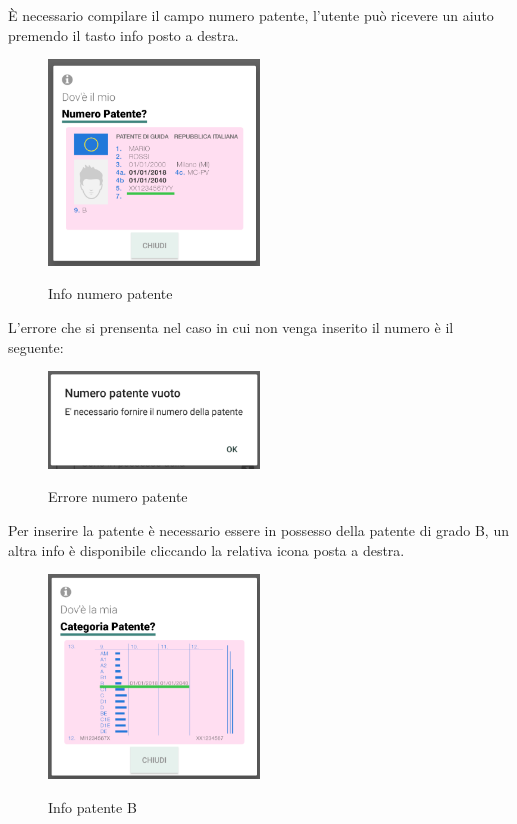 \begin{itemize}
È necessario compilare il campo numero patente, l'utente può ricevere un aiuto premendo il tasto info posto a destra.
 \begin{figure}[H] 
 	\centering 
 	\includegraphics[width=0.5\textwidth]{res/images/patente1_info.png}\\
 	\caption{Info numero patente}
 	\label{patente1}
 \end{figure}
L'errore che si prensenta nel caso in cui non venga inserito il numero è il seguente:
 \begin{figure}[H] 
	\centering 
	\includegraphics[width=0.5\textwidth]{res/images/patente1errore.png}\\
	\caption{Errore numero patente}
	\label{patenteerror}
\end{figure}
\pagebreak

Per inserire la patente è necessario essere in possesso della patente di grado B, un altra info è disponibile cliccando la relativa icona posta a destra.
\begin{figure}[H] 
	\centering 
	\includegraphics[width=0.5\textwidth]{res/images/patente1_info2.png}\\
	\caption{Info patente B}
	\label{patente2}
\end{figure}
\pagebreak


\end{itemize}

